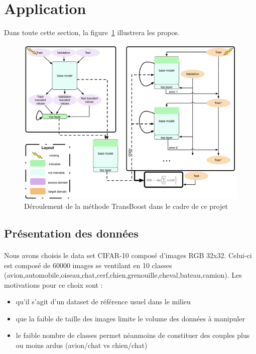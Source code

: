 \documentclass[11 pt]{article}
\begin{document}
\section{Application}

Dans toute cette section, la figure~\ref{figRes} illustrera les propos.

\begin{figure}[H]
  \includegraphics[width=\textwidth]{fig1.pdf}
  \caption{Déroulement de la méthode TransBoost dans le cadre de ce projet}
  \label{figRes}
\end{figure}

\subsection{Présentation des données}
\paragraph{}Nous avons choisis le data set CIFAR-10 composé d’images RGB 32x32. Celui-ci est composé de 60000 images se ventilant en 10 classes (avion,automobile,oiseau,chat,cerf,chien,grenouille,cheval,bateau,camion). Les motivations pour ce choix sont :\\ \medskip
\begin{itemize}
  \item qu’il s’agit d’un dataset de référence usuel dans le milieu
  \item que la faible de taille des images limite le volume des données à manipuler
  \item le faible nombre de classes permet néanmoins de constituer des couples plus ou moins ardus (avion/chat vs chien/chat)
\end{itemize}
\end{document}
